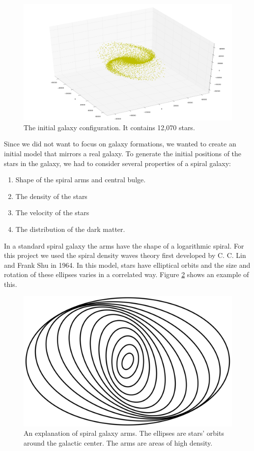 \documentclass{article}
\begin{document}
\begin{figure}[Ht!]
\centering
\includegraphics[width=\columnwidth]{initial-conditions.png}
\caption{The initial galaxy configuration.  It contains 12,070 stars. \label{fig:init-cond}}
\end{figure}

Since we did not want to focus on galaxy formations, we wanted to create an initial model that mirrors a real galaxy.  To generate the initial positions of the stars in the galaxy, we had to consider several properties of a spiral galaxy:
\begin{enumerate}
  \item Shape of the spiral arms and central bulge. 
  \item The density of the stars
  \item The velocity of the stars 
  \item The distribution of the dark matter. 
\end{enumerate}

In a standard spiral galaxy the arms have the shape of a logarithmic spiral. For this project we used the spiral density waves theory first developed by C. C. Lin and Frank Shu in 1964. In this model, stars have elliptical orbits and the size and rotation of these ellipses varies in a correlated way. Figure \ref{fig:spiral-arms} shows an example of this.
\begin{figure}[Ht!]
\centering
\includegraphics[width=.8\columnwidth]{spiral-arms.png}
\caption{An explanation of spiral galaxy arms.  The ellipses are stars' orbits around the galactic center.  The arms are areas of high density. \label{fig:spiral-arms}}
\end{figure}
\end{document}
